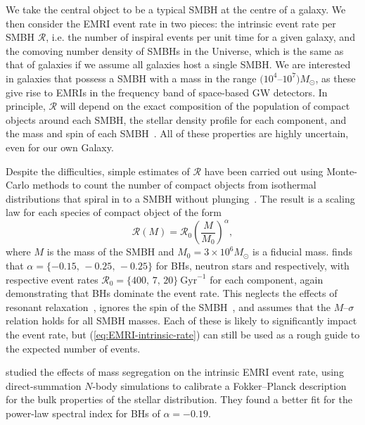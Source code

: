 \documentclass[aps,prd,amsfonts,amssymb,amsmath,nofootinbib,showpacs,superscriptaddress,twocolumn]{revtex4}
\newcommand{\eqnref}[1]{(\ref{eq:#1})}
\begin{document}
We take the central object to be a typical SMBH at the centre of a galaxy. We then consider the EMRI event rate in two pieces: the intrinsic event rate per SMBH $\mathcal{R}$, i.e. the number of inspiral events per unit time for a given galaxy, and the comoving number density of SMBHs in the Universe, which is the same as that of galaxies if we assume all galaxies host a single SMBH. We are interested in galaxies that possess a SMBH with a mass in the range $(10^{4}$--$10^7) M_\odot$, as these give rise to EMRIs in the frequency band of space-based GW detectors. In principle, $\mathcal{R}$ will depend on the exact composition of the population of compact objects around each SMBH, the stellar density profile for each component, and the mass and spin of each SMBH~\cite{Alexander2005}. All of these properties are highly uncertain, even for our own Galaxy.

Despite the difficulties, simple estimates of $\mathcal{R}$ have been carried out using Monte-Carlo methods to count the number of compact objects from isothermal distributions that spiral in to a SMBH without plunging~\cite{Merritt2013}. The result is a scaling law for each species of compact object of the form
\begin{equation}
\label{eq:EMRI-intrinsic-rate}
\mathcal{R}(M) = \mathcal{R}_0 \left(\frac{M}{M_0}\right)^\alpha,
\end{equation}
where $M$ is the mass of the SMBH and $M_0 = 3\times 10^6 M_\odot$ is a fiducial mass.  finds that $\alpha = \{-0.15,\,-0.25,\,-0.25\}$ for BHs, neutron stars and respectively, with respective event rates $\mathcal{R}_0 = \{400,\, 7,\, 20\}~\mathrm{Gyr}^{-1}$ for each component, again demonstrating that BHs dominate the event rate. This neglects the effects of resonant relaxation~\cite{Rauch1996,Merritt2011}, ignores the spin of the SMBH~\cite{Amaro-Seoane2012b}, and assumes that the $M$--$\sigma$ relation holds for all SMBH masses. Each of these is likely to significantly impact the event rate, but \eqnref{EMRI-intrinsic-rate} can still be used as a rough guide to the expected number of events.

 studied the effects of mass segregation on the intrinsic EMRI event rate, using direct-summation $N$-body simulations to calibrate a Fokker--Planck description for the bulk properties of the stellar distribution. They found a better fit for the power-law spectral index for BHs of $\alpha = -0.19$.
\end{document}
